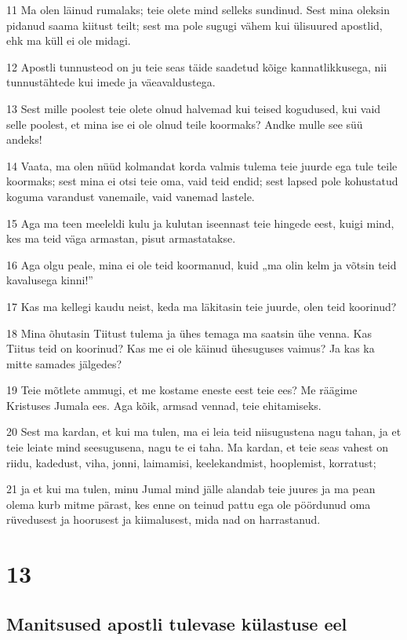 \par 11 Ma olen läinud rumalaks; teie olete mind selleks sundinud. Sest mina oleksin pidanud saama kiitust teilt; sest ma pole sugugi vähem kui ülisuured apostlid, ehk ma küll ei ole midagi.
\par 12 Apostli tunnusteod on ju teie seas täide saadetud kõige kannatlikkusega, nii tunnustähtede kui imede ja väeavaldustega.
\par 13 Sest mille poolest teie olete olnud halvemad kui teised kogudused, kui vaid selle poolest, et mina ise ei ole olnud teile koormaks? Andke mulle see süü andeks!
\par 14 Vaata, ma olen nüüd kolmandat korda valmis tulema teie juurde ega tule teile koormaks; sest mina ei otsi teie oma, vaid teid endid; sest lapsed pole kohustatud koguma varandust vanemaile, vaid vanemad lastele.
\par 15 Aga ma teen meeleldi kulu ja kulutan iseennast teie hingede eest, kuigi mind, kes ma teid väga armastan, pisut armastatakse.
\par 16 Aga olgu peale, mina ei ole teid koormanud, kuid „ma olin kelm ja võtsin teid kavalusega kinni!”
\par 17 Kas ma kellegi kaudu neist, keda ma läkitasin teie juurde, olen teid koorinud?
\par 18 Mina õhutasin Tiitust tulema ja ühes temaga ma saatsin ühe venna. Kas Tiitus teid on koorinud? Kas me ei ole käinud ühesuguses vaimus? Ja kas ka mitte samades jälgedes?
\par 19 Teie mõtlete ammugi, et me kostame eneste eest teie ees? Me räägime Kristuses Jumala ees. Aga kõik, armsad vennad, teie ehitamiseks.
\par 20 Sest ma kardan, et kui ma tulen, ma ei leia teid niisugustena nagu tahan, ja et teie leiate mind seesugusena, nagu te ei taha. Ma kardan, et teie seas vahest on riidu, kadedust, viha, jonni, laimamisi, keelekandmist, hooplemist, korratust;
\par 21 ja et kui ma tulen, minu Jumal mind jälle alandab teie juures ja ma pean olema kurb mitme pärast, kes enne on teinud pattu ega ole pöördunud oma rüvedusest ja hoorusest ja kiimalusest, mida nad on harrastanud.


\chapter{13}

\section*{Manitsused apostli tulevase külastuse eel}

